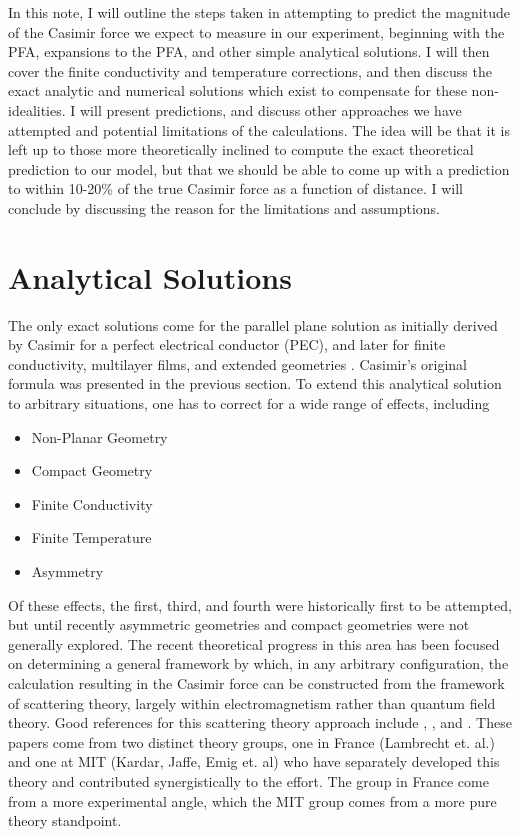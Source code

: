 \documentclass[11pt,traditabstract]{article}
\begin{document}
In this note, I will outline the steps taken in attempting to predict the magnitude of the Casimir force we expect to measure in our experiment, beginning with the PFA, expansions to the PFA, and other simple analytical solutions. I will then cover the finite conductivity and temperature corrections, and then discuss the exact analytic and numerical solutions which exist to compensate for these non-idealities. I will present predictions, and discuss other approaches we have attempted and potential limitations of the calculations. The idea will be that it is left up to those more theoretically inclined to compute the exact theoretical prediction to our model, but that we should be able to come up with a prediction to within 10-20\% of the true Casimir force as a function of distance. I will conclude by discussing the reason for the limitations and assumptions.

\pagebreak
\section{Analytical Solutions}

The only exact solutions come for the parallel plane solution as initially derived by Casimir \citep{Casimir} for a perfect electrical conductor (PEC), and later for finite conductivity, multilayer films, and extended geometries \citep{rodr}. Casimir's original formula was presented in the previous section. To extend this analytical solution to arbitrary situations, one has to correct for a wide range of effects, including
\begin{itemize}
\item Non-Planar Geometry
\item Compact Geometry
\item Finite Conductivity
\item Finite Temperature
\item Asymmetry
\end{itemize}
Of these effects, the first, third, and fourth were historically first to be attempted, but until recently asymmetric geometries and compact geometries were not generally explored. The recent theoretical progress in this area has been focused on determining a general framework by which, in any arbitrary configuration, the calculation resulting in the Casimir force can be constructed from the framework of scattering theory, largely within electromagnetism rather than quantum field theory. Good references for this scattering theory approach include \citet{ScatteringTheory}, \citet{Emig07}, and \citet{Rahi}. These papers come from two distinct theory groups, one in France (Lambrecht et. al.) and one at MIT (Kardar, Jaffe, Emig et. al) who have separately developed this theory and contributed synergistically to the effort. The group in France come from a more experimental angle, which the MIT group comes from a more pure theory standpoint.
\end{document}
